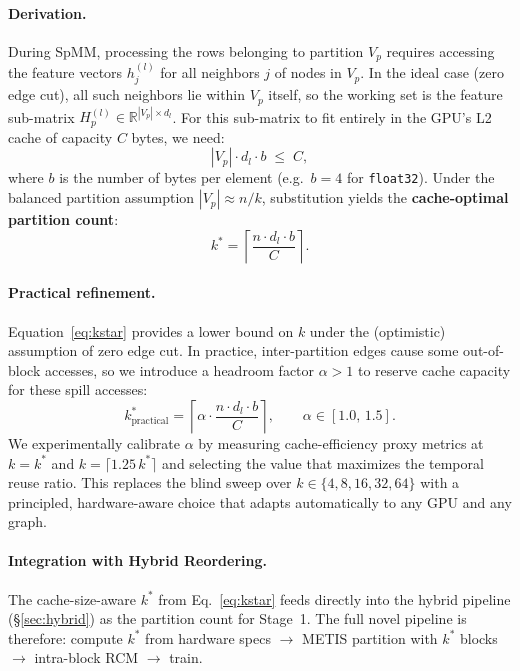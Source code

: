 \documentclass[sigconf,review]{acmart}
\begin{document}
\paragraph{Derivation.} During SpMM, processing the rows belonging to partition $V_p$ requires accessing the feature vectors $h_j^{(l)}$ for all neighbors $j$ of nodes in $V_p$. In the ideal case (zero edge cut), all such neighbors lie within $V_p$ itself, so the working set is the feature sub-matrix $H_p^{(l)} \in \mathbb{R}^{|V_p| \times d_l}$. For this sub-matrix to fit entirely in the GPU's L2 cache of capacity $C$ bytes, we need:
\begin{equation}\label{eq:cache_constraint}
    |V_p| \cdot d_l \cdot b \;\le\; C,
\end{equation}
where $b$ is the number of bytes per element (e.g.\ $b = 4$ for \texttt{float32}). Under the balanced partition assumption $|V_p| \approx n/k$, substitution yields the \textbf{cache-optimal partition count}:
\begin{equation}\label{eq:kstar}
    \boxed{\;k^* = \left\lceil \frac{n \cdot d_l \cdot b}{C} \right\rceil.\;}
\end{equation}

\paragraph{Practical refinement.}
Equation~\eqref{eq:kstar} provides a lower bound on $k$ under the (optimistic) assumption of zero edge cut. In practice, inter-partition edges cause some out-of-block accesses, so we introduce a headroom factor $\alpha > 1$ to reserve cache capacity for these spill accesses:
\begin{equation}\label{eq:kstar_practical}
    k^*_{\text{practical}} = \left\lceil \alpha \cdot \frac{n \cdot d_l \cdot b}{C} \right\rceil, \qquad \alpha \in [1.0,\, 1.5].
\end{equation}
We experimentally calibrate $\alpha$ by measuring cache-efficiency proxy metrics at $k = k^*$ and $k = \lceil 1.25\, k^* \rceil$ and selecting the value that maximizes the temporal reuse ratio. This replaces the blind sweep over $k \in \{4, 8, 16, 32, 64\}$ with a principled, hardware-aware choice that adapts automatically to any GPU and any graph.

\paragraph{Integration with Hybrid Reordering.}
The cache-size-aware $k^*$ from Eq.~\eqref{eq:kstar} feeds directly into the hybrid pipeline (\S\ref{sec:hybrid}) as the partition count for Stage~1. The full novel pipeline is therefore: compute $k^*$ from hardware specs $\to$ METIS partition with $k^*$ blocks $\to$ intra-block RCM $\to$ train.
\end{document}
